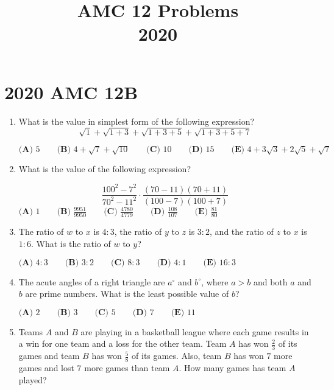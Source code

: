 \documentclass{article}
\title{AMC 12 Problems \\ 2020}
\date{}
\begin{document}
\maketitle\thispagestyle{fancy}\newpage\section*{2020 AMC 12B}\begin{enumerate}[label=\arabic*., itemsep=0.5em]\item What is the value in simplest form of the following expression?
\begin{equation*}
\sqrt{1} + \sqrt{1+3} + \sqrt{1+3+5} + \sqrt{1+3+5+7}
\end{equation*}


\(\textbf{(A) }5 \qquad \textbf{(B) }4 + \sqrt{7} + \sqrt{10} \qquad \textbf{(C) } 10 \qquad \textbf{(D) } 15 \qquad \textbf{(E) } 4 + 3\sqrt{3} + 2\sqrt{5} + \sqrt{7}\)\par \vspace{0.5em}\item What is the value of the following expression?

\begin{equation*}
\frac{100^2-7^2}{70^2-11^2} \cdot \frac{(70-11)(70+11)}{(100-7)(100+7)}
\end{equation*}
\(\textbf{(A) } 1 \qquad \textbf{(B) } \frac{9951}{9950} \qquad \textbf{(C) } \frac{4780}{4779} \qquad \textbf{(D) } \frac{108}{107} \qquad \textbf{(E) } \frac{81}{80} \)\par \vspace{0.5em}\item The ratio of \(w\) to \(x\) is \(4 : 3\), the ratio of \(y\) to \(z\) is \(3 : 2\), and the ratio of \(z\) to \(x\) is \(1 : 6\). What is the ratio of \(w\) to \(y\)?

\(\textbf{(A) }4:3 \qquad \textbf{(B) }3:2 \qquad \textbf{(C) } 8:3 \qquad \textbf{(D) } 4:1 \qquad \textbf{(E) } 16:3 \)\par \vspace{0.5em}\item The acute angles of a right triangle are \(a^{\circ}\) and \(b^{\circ}\), where \(a>b\) and both \(a\) and \(b\) are prime numbers. What is the least possible value of \(b\)?

\(\textbf{(A) }2\qquad\textbf{(B) }3\qquad\textbf{(C) }5\qquad\textbf{(D) }7\qquad\textbf{(E) }11\)\par \vspace{0.5em}\item Teams \(A\) and \(B\) are playing in a basketball league where each game results in a win for one team and a loss for the other team. Team \(A\) has won \(\tfrac{2}{3}\) of its games and team \(B\) has won \(\tfrac{5}{8}\) of its games. Also, team \(B\) has won \(7\) more games and lost \(7\) more games than team \(A.\) How many games has team \(A\) played?


\end{enumerate}
\end{document}
